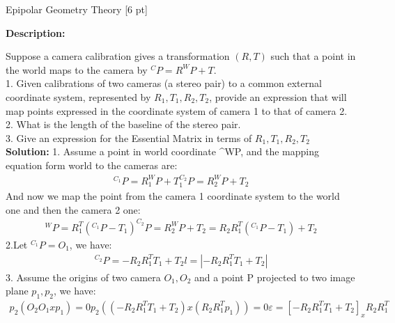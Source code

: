\documentclass{assignment}
\date{November 2, 2016}
\begin{document}
\begin{problemlist}




\pbitem Epipolar Geometry Theory [6 pt]

\textbf{Description:}

Suppose a camera calibration gives a transformation $(R, T)$ such that a point in the world maps to the camera by $^{C}P = R^{W}P + T$.\\

1. Given calibrations of two cameras (a stereo pair) to a common external coordinate system, represented by $R_1, T_1, R_2, T_2$, provide an expression that will map points expressed in the coordinate system of camera 1 to that of camera 2.\\
2. What is the length of the baseline of the stereo pair.\\
3. Give an expression for the Essential Matrix in terms of $R_1, T_1, R_2, T_2$\\

\textbf{Solution:}
1. Assume a point in world coordinate ^WP, and the mapping equation form world to the cameras are:
\begin{align*}
    ^{C_1}P = R_1^{W}P + T_1
    ^{C_2}P = R_2^{W}P + T_2
\end{align*}
And now we map the point from the camera 1 coordinate system to the world one and then the camera 2 one:
\begin{align*}
    ^{W}P = R_1^{T}(^{C_1}P - T_1)
    ^{C_2}P = R_2^{W}P + T_2 = R_2R_1^{T}(^{C_1}P-T_1) + T_2
\end{align*}
2.Let $^{C_1}P = O_1$, we have:
\begin{align*}
    ^{C_2}P = -R_2R_1^{T}T_1 + T_2
    l = |-R_2R_1^{T}T_1 + T_2|
\end{align*}
3. Assume the origins of two camera $O_1, O_2$ and a point P projected to two image plane $p_1, p_2$, we have:
\begin{align*}
    p_2(O_2O_1xp_1) = 0
    p_2((-R_2R_1^{T}T_1+T_2)x(R_2R_1^{T}p_1))=0
    \varepsilon = [-R_2R_1^{T}T_1+T_2]_xR_2R_1^{T}
\end{align*}


\end{problemlist}
\end{document}

